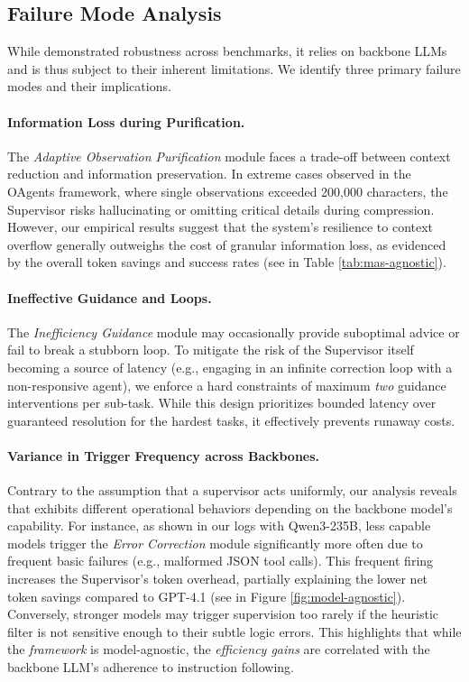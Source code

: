 \subsection{Failure Mode Analysis}

While \method demonstrated robustness across benchmarks, it relies on backbone LLMs and is thus subject to their inherent limitations. We identify three primary failure modes and their implications.

\paragraph{Information Loss during Purification.} The \textit{Adaptive Observation Purification} module faces a trade-off between context reduction and information preservation. In extreme cases observed in the OAgents framework, where single observations exceeded 200,000 characters, the Supervisor risks hallucinating or omitting critical details during compression. However, our empirical results suggest that the system's resilience to context overflow generally outweighs the cost of granular information loss, as evidenced by the overall token savings and success rates (see in Table \ref{tab:mas-agnostic}).

\paragraph{Ineffective Guidance and Loops.} The \textit{Inefficiency Guidance} module may occasionally provide suboptimal advice or fail to break a stubborn loop. To mitigate the risk of the Supervisor itself becoming a source of latency (e.g., engaging in an infinite correction loop with a non-responsive agent), we enforce a hard constraints of maximum \textit{two} guidance interventions per sub-task. While this design prioritizes bounded latency over guaranteed resolution for the hardest tasks, it effectively prevents runaway costs.

\paragraph{Variance in Trigger Frequency across Backbones.} Contrary to the assumption that a supervisor acts uniformly, our analysis reveals that \method exhibits different operational behaviors depending on the backbone model's capability. For instance, as shown in our logs with Qwen3-235B, less capable models trigger the \textit{Error Correction} module significantly more often due to frequent basic failures (e.g., malformed JSON tool calls). This frequent firing increases the Supervisor's token overhead, partially explaining the lower net token savings compared to GPT-4.1 (see in Figure \ref{fig:model-agnostic}). Conversely, stronger models may trigger supervision too rarely if the heuristic filter is not sensitive enough to their subtle logic errors. This highlights that while the \textit{framework} is model-agnostic, the \textit{efficiency gains} are correlated with the backbone LLM's adherence to instruction following.

